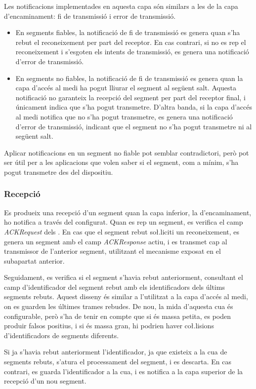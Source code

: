 \documentclass{tfgitic}[2024/07/01]
\begin{document}
{Les notificacions implementades en aquesta capa són similars a les de la capa d'encaminament: fi de transmissió i error de transmissió.
\begin{itemize}
    \item En segments fiables, la notificació de fi de transmissió es genera quan s'ha rebut el reconeixement per part del receptor. En cas contrari, si no es rep el reconeixement i s'esgoten els intents de transmissió, es genera una notificació d'error de transmissió.
    \item En segments no fiables, la notificació de fi de transmissió es genera quan la capa d'accés al medi ha pogut lliurar el segment al següent salt. Aquesta notificació no garanteix la recepció del segment per part del receptor final, i únicament indica que s'ha pogut transmetre. D'altra banda, si la capa d'accés al medi notifica que no s'ha pogut transmetre, es genera una notificació d'error de transmissió, indicant que el segment no s'ha pogut transmetre ni al següent salt.
\end{itemize}
Aplicar notificacions en un segment no fiable pot semblar contradictori, però pot ser útil per a les aplicacions que volen saber si el segment, com a mínim, s'ha pogut transmetre des del dispositiu. 
\subsubsection{Recepció}
Es produeix una recepció d'un segment quan la capa inferior, la d'encaminament, ho notifica a través del  configurat. Quan es rep un segment, es verifica el camp \emph{ACKRequest} dels . En cas que el segment rebut so\l.liciti un reconeixement, es genera un segment amb el camp \emph{ACKResponse} actiu, i es transmet cap al transmissor de l'anterior segment, utilitzant el mecanisme exposat en el subapartat anterior.

Seguidament, es verifica si el segment s'havia rebut anteriorment, consultant el camp d'identificador del segment rebut amb els identificadors dels últims segments rebuts. Aquest disseny és similar a l'utilitzat a la capa d'accés al medi, on es guarden les últimes trames rebudes. De nou, la mida d'aquesta cua és configurable, però s'ha de tenir en compte que si és massa petita, es poden produir falsos positius, i si és massa gran, hi podrien haver co\l.lisions d'identificadors de segments diferents.

Si ja s'havia rebut anteriorment l'identificador, ja que existeix a la cua de segments rebuts, s'atura el processament del segment, i es descarta. En cas contrari, es guarda l'identificador a la cua, i es notifica a la capa superior de la recepció d'un nou segment.
}
\end{document}
